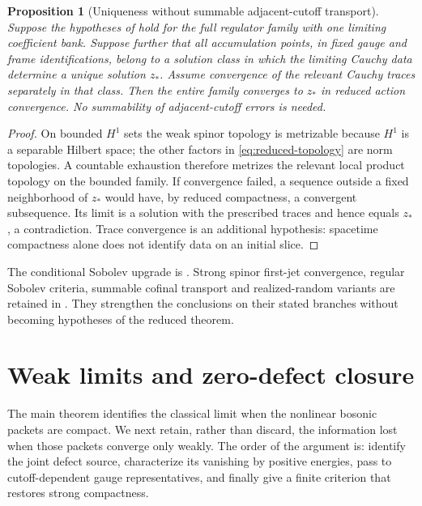 \documentclass[11pt]{article}
\numberwithin{equation}{section}
\newtheorem{proposition}[proposition]{Proposition}
\theoremstyle{definition}
\theoremstyle{remark}
\begin{document}
\begin{proposition}[Uniqueness without summable adjacent-cutoff transport]
\label{prop:reduced-unique}
Suppose the hypotheses of  hold for the full
regulator family with one limiting coefficient bank.  Suppose further that
all accumulation points, in fixed gauge and frame identifications, belong
to a solution class in which the limiting Cauchy data determine a unique
solution $z_*$.  Assume convergence of the relevant Cauchy traces separately
in that class.  Then the entire family converges to $z_*$ in reduced action
convergence.  No summability of adjacent-cutoff errors is needed.
\end{proposition}
\begin{proof}
On bounded $H^1$ sets the weak spinor topology is metrizable because $H^1$
is a separable Hilbert space; the other factors in
\eqref{eq:reduced-topology} are norm topologies.  A countable exhaustion
therefore metrizes the relevant local product topology on the bounded
family.  If convergence failed, a sequence outside a fixed neighborhood of
$z_*$ would have, by reduced compactness, a convergent subsequence.  Its
limit is a solution with the prescribed traces and hence equals $z_*$,
a contradiction.  Trace convergence is an additional hypothesis:
spacetime compactness alone does not identify data on an initial slice.
\end{proof}

The conditional Sobolev upgrade is .
Strong spinor first-jet convergence, regular Sobolev criteria, summable
cofinal transport and realized-random variants are retained in
. They strengthen the conclusions on their stated
branches without becoming hypotheses of the reduced theorem.

\section{Weak limits and zero-defect closure}
\label{sec:defects}

The main theorem identifies the classical limit when the nonlinear
bosonic packets are compact. We next retain, rather than discard, the
information lost when those packets converge only weakly. The order of the
argument is: identify the joint defect source, characterize its vanishing
by positive energies, pass to cutoff-dependent gauge representatives, and
finally give a finite criterion that restores strong compactness.
\end{document}
